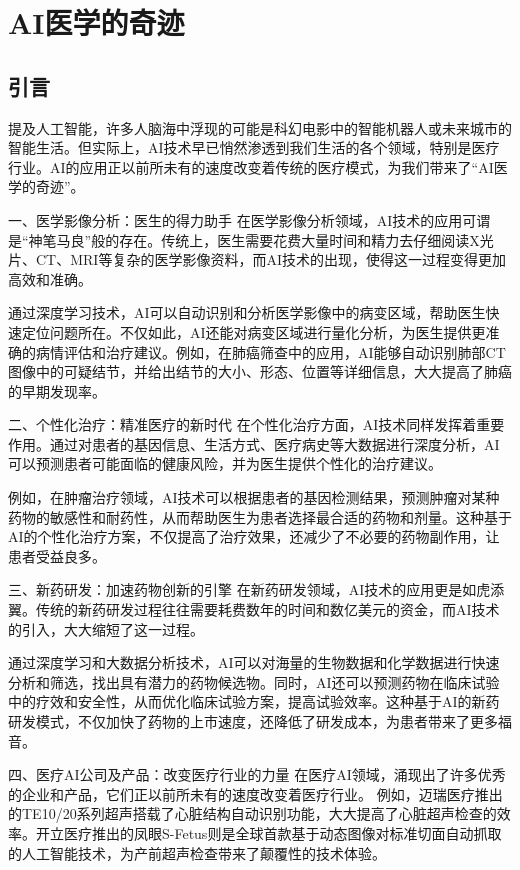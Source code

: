 \setchapterpreamble[u]{\margintoc}
\chapter{AI医学的奇迹}
\section{引言}
提及人工智能，许多人脑海中浮现的可能是科幻电影中的智能机器人或未来城市的智能生活。但实际上，AI技术早已悄然渗透到我们生活的各个领域，特别是医疗行业。AI的应用正以前所未有的速度改变着传统的医疗模式，为我们带来了“AI医学的奇迹”。

一、医学影像分析：医生的得力助手
在医学影像分析领域，AI技术的应用可谓是“神笔马良”般的存在。传统上，医生需要花费大量时间和精力去仔细阅读X光片、CT、MRI等复杂的医学影像资料，而AI技术的出现，使得这一过程变得更加高效和准确。

通过深度学习技术，AI可以自动识别和分析医学影像中的病变区域，帮助医生快速定位问题所在。不仅如此，AI还能对病变区域进行量化分析，为医生提供更准确的病情评估和治疗建议。例如，在肺癌筛查中的应用，AI能够自动识别肺部CT图像中的可疑结节，并给出结节的大小、形态、位置等详细信息，大大提高了肺癌的早期发现率。

二、个性化治疗：精准医疗的新时代
在个性化治疗方面，AI技术同样发挥着重要作用。通过对患者的基因信息、生活方式、医疗病史等大数据进行深度分析，AI可以预测患者可能面临的健康风险，并为医生提供个性化的治疗建议。

例如，在肿瘤治疗领域，AI技术可以根据患者的基因检测结果，预测肿瘤对某种药物的敏感性和耐药性，从而帮助医生为患者选择最合适的药物和剂量。这种基于AI的个性化治疗方案，不仅提高了治疗效果，还减少了不必要的药物副作用，让患者受益良多。

三、新药研发：加速药物创新的引擎
在新药研发领域，AI技术的应用更是如虎添翼。传统的新药研发过程往往需要耗费数年的时间和数亿美元的资金，而AI技术的引入，大大缩短了这一过程。

通过深度学习和大数据分析技术，AI可以对海量的生物数据和化学数据进行快速分析和筛选，找出具有潜力的药物候选物。同时，AI还可以预测药物在临床试验中的疗效和安全性，从而优化临床试验方案，提高试验效率。这种基于AI的新药研发模式，不仅加快了药物的上市速度，还降低了研发成本，为患者带来了更多福音。

四、医疗AI公司及产品：改变医疗行业的力量
在医疗AI领域，涌现出了许多优秀的企业和产品，它们正以前所未有的速度改变着医疗行业。
例如，迈瑞医疗推出的TE10/20系列超声搭载了心脏结构自动识别功能，大大提高了心脏超声检查的效率。开立医疗推出的凤眼S-Fetus则是全球首款基于动态图像对标准切面自动抓取的人工智能技术，为产前超声检查带来了颠覆性的技术体验。

